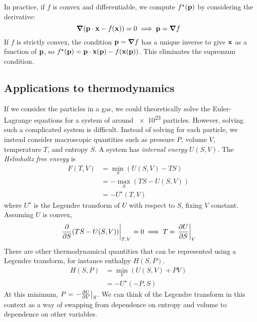 \noindent In practice, if \( f \) is convex and differentiable, we compute \( f^\star(\vb p) \) by considering the derivative:
\[
	\grad(\vb p \cdot \vb x - f(\vb x)) = 0 \implies \vb p = \grad{f}
\]
If \( f \) is strictly convex, the condition \( \vb p = \grad{f} \) has a unique inverse to give \( \vb x \) as a function of \( \vb p \), so \( f^\star(\vb p) = \vb p \cdot \vb x(\vb p) - f(\vb x(\vb p)) \).
This eliminates the supremum condition.

\subsection{Applications to thermodynamics}
If we consider the particles in a gas, we could theoretically solve the Euler-Lagrange equations for a system of around \num{e23} particles.
However, solving such a complicated system is difficult.
Instead of solving for each particle, we instead consider macroscopic quantities such as pressure \( P \), volume \( V \), temperature \( T \), and entropy \( S \).
A system has \textit{internal energy} \( U(S, V) \).
The \textit{Helmholtz free energy} is
\begin{align*}
	F(T, V) & = \min_S (U(S, V) - TS)   \\
	        & = - \max_S (TS - U(S, V)) \\
	        & = -U^\star(T, V)
\end{align*}
where \( U^\star \) is the Legendre transform of \( U \) with respect to \( S \), fixing \( V \) constant.
Assuming \( U \) is convex,
\[
	\eval{\pdv{S} \qty(TS - U(S,V))}_{T,V} = 0 \implies T = \eval{\pdv{U}{S}}_{V}
\]
There are other thermodynamical quantities that can be represented using a Legendre transform, for instance enthalpy \( H(S, P) \).
\begin{align*}
	H(S, P) & = \min_V (U(S,V) + PV) \\
	        & = - U^\star(-P, S)
\end{align*}
At this minimum, \( P = \eval{-\pdv{U}{V}}_S \).
We can think of the Legendre transform in this context as a way of swapping from dependence on entropy and volume to dependence on other variables.

